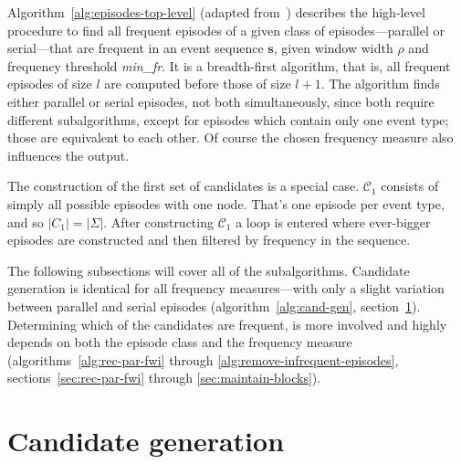 
Algorithm~\ref{alg:episodes-top-level} (adapted from~\citep{mannila1997discovery}) describes the high-level procedure to find all frequent episodes of a given class of episodes---parallel or serial---that are frequent in an event sequence $ \boldsymbol{s} $, given window width $ \rho $ and frequency threshold \emph{min\_fr}. It is a breadth-first algorithm, that is, all frequent episodes of size $ l $ are computed before those of size $ l + 1 $. The algorithm finds either parallel or serial episodes, not both simultaneously, since both require different subalgorithms, except for episodes which contain only one event type; those are equivalent to each other. Of course the chosen frequency measure also influences the output.

The construction of the first set of candidates is a special case. $ \mathcal{C}_1 $ consists of simply all possible episodes with one node. That's one episode per event type, and so $ | C_1 | = | \Sigma | $. After constructing $ \mathcal{C}_1 $ a loop is entered where ever-bigger episodes are constructed and then filtered by frequency in the sequence.

The following subsections will cover all of the subalgorithms. Candidate generation is identical for all frequency measures---with only a slight variation between parallel and serial episodes (algorithm~\ref{alg:cand-gen}, section~\ref{sec:cand-gen}). Determining which of the candidates are frequent, is more involved and highly depends on both the episode class and the frequency measure (algorithms~\ref{alg:rec-par-fwi} through \ref{alg:remove-infrequent-episodes}, sections~\ref{sec:rec-par-fwi} through \ref{sec:maintain-blocks}).

\section{Candidate generation}
\label{sec:cand-gen}

